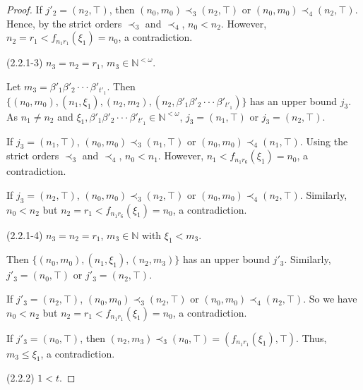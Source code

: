 \documentclass[preprint,12pt]{elsarticle}
\numberwithin{equation}{section}
\begin{document}
\begin{proof}
If $j'_{2}=(n_{2},\top)$, then $(n_{0},m_{0})\prec_{3}(n_{2},\top)$ or $(n_{0},m_{0})\prec_{4}(n_{2},\top)$. Hence, by the strict orders $\prec_{3}$ and $\prec_{4}$, $n_{0}<n_{2}$. However, $n_{2}=r_{1}<f_{n_{1}r_{1}}(\xi_{1})=n_{0}$, a contradiction.

(2.2.1-3) $n_{3}=n_{2}=r_{1}$, $m_{3}\in\mathbb{N}^{<\omega}$.

Let $m_{3}=\beta'_{1}\beta'_{2}\cdot\cdot\cdot\beta'_{t'_{1}}$. Then $\{(n_{0},m_{0}),(n_{1},\xi_{1}),(n_{2},m_{2}),(n_{2},\beta'_{1}\beta'_{2}\cdot\cdot\cdot\beta'_{t'_{1}})\}$ has an upper bound $j_{3}$. As $n_{1}\neq n_{2}$ and $\xi_{1},\beta'_{1}\beta'_{2}\cdot\cdot\cdot\beta'_{t'_{1}}\in\mathbb{N}^{<\omega}$, $j_{3}=(n_{1},\top)$ or $j_{3}=(n_{2},\top)$.

If $j_{3}=(n_{1},\top)$, $(n_{0},m_{0})\prec_{3}(n_{1},\top)$ or $(n_{0},m_{0})\prec_{4}(n_{1},\top)$. Using the strict orders $\prec_{3}$ and $\prec_{4}$, $n_{0}<n_{1}$. However, $n_{1}<f_{n_{1}r_{6}}(\xi_{1})=n_{0}$, a contradiction.

If $j_{3}=(n_{2},\top)$, $(n_{0},m_{0})\prec_{3}(n_{2},\top)$ or $(n_{0},m_{0})\prec_{4}(n_{2},\top)$. Similarly, $n_{0}<n_{2}$ but $n_{2}=r_{1}<f_{n_{1}r_{6}}(\xi_{1})=n_{0}$, a contradiction.

(2.2.1-4) $n_{3}=n_{2}=r_{1}$, $m_{3}\in\mathbb{N}$ with $\xi_{1}<m_{3}$.

Then $\{(n_{0},m_{0}),(n_{1},\xi_{1}),(n_{2},m_{3})\}$ has an upper bound $j'_{3}$. Similarly, $j'_{3}=(n_{0},\top)$ or $j'_{3}=(n_{2},\top)$.

If $j'_{3}=(n_{2},\top)$, $(n_{0},m_{0})\prec_{3}(n_{2},\top)$ or $(n_{0},m_{0})\prec_{4}(n_{2},\top)$. So we have $n_{0}<n_{2}$ but $n_{2}=r_{1}<f_{n_{1}r_{1}}(\xi_{1})=n_{0}$, a contradiction.

If $j'_{3}=(n_{0},\top)$, then  $(n_{2},m_{3})\prec_{3}(n_{0},\top)=(f_{n_{1}r_{1}}(\xi_{1}),\top)$. Thus, $m_{3}\leq\xi_{1}$, a contradiction.


(2.2.2) $1<t$.


\end{proof}
\end{document}
